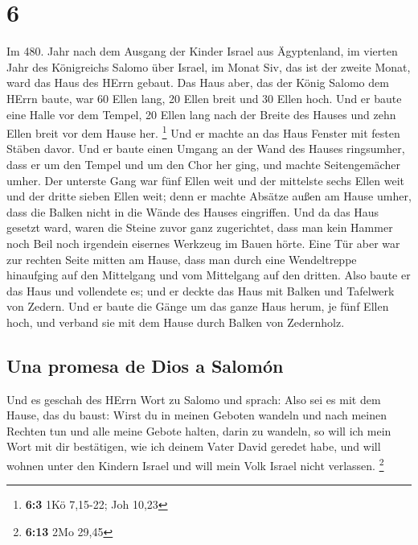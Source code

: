 \hypertarget{section-5}{%
\section{6}\label{section-5}}

 Im 480. Jahr nach dem Ausgang der Kinder Israel aus
Ägyptenland, im vierten Jahr des Königreichs Salomo über Israel, im
Monat Siv, das ist der zweite Monat, ward das Haus des HErrn gebaut.
 Das Haus aber, das der König Salomo dem HErrn baute, war
60 Ellen lang, 20 Ellen breit und 30 Ellen hoch.  Und er
baute eine Halle vor dem Tempel, 20 Ellen lang nach der Breite des
Hauses und zehn Ellen breit vor dem Hause her. \footnote{\textbf{6:3}
  1Kö 7,15-22; Joh 10,23}  Und er machte an das Haus
Fenster mit festen Stäben davor.  Und er baute einen
Umgang an der Wand des Hauses ringsumher, dass er um den Tempel und um
den Chor her ging, und machte Seitengemächer umher.  Der
unterste Gang war fünf Ellen weit und der mittelste sechs Ellen weit und
der dritte sieben Ellen weit; denn er machte Absätze außen am Hause
umher, dass die Balken nicht in die Wände des Hauses eingriffen.
 Und da das Haus gesetzt ward, waren die Steine zuvor ganz
zugerichtet, dass man kein Hammer noch Beil noch irgendein eisernes
Werkzeug im Bauen hörte.  Eine Tür aber war zur rechten
Seite mitten am Hause, dass man durch eine Wendeltreppe hinaufging auf
den Mittelgang und vom Mittelgang auf den dritten.  Also
baute er das Haus und vollendete es; und er deckte das Haus mit Balken
und Tafelwerk von Zedern.  Und er baute die Gänge um das
ganze Haus herum, je fünf Ellen hoch, und verband sie mit dem Hause
durch Balken von Zedernholz.

\hypertarget{una-promesa-de-dios-a-salomuxf3n}{%
\subsection{Una promesa de Dios a
Salomón}\label{una-promesa-de-dios-a-salomuxf3n}}

 Und es geschah des HErrn Wort zu Salomo und sprach:
 Also sei es mit dem Hause, das du baust: Wirst du in
meinen Geboten wandeln und nach meinen Rechten tun und alle meine Gebote
halten, darin zu wandeln, so will ich mein Wort mit dir bestätigen, wie
ich deinem Vater David geredet habe,  und will wohnen
unter den Kindern Israel und will mein Volk Israel nicht verlassen.
\footnote{\textbf{6:13} 2Mo 29,45}

